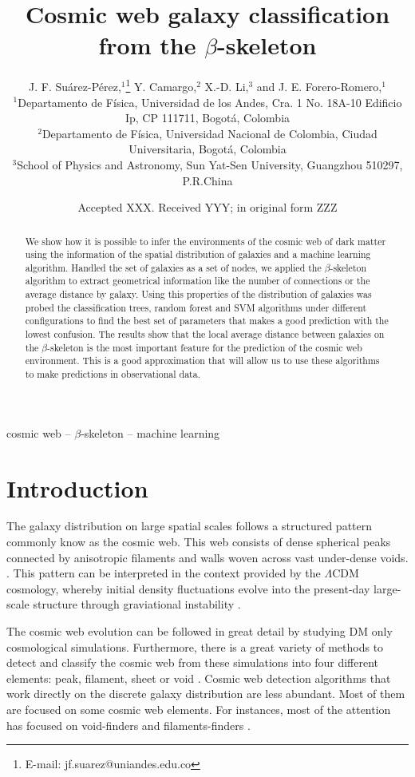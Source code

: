\documentclass[usenatbib]{mnras}
\title[The $\beta$-skeleton and the T-web]{Cosmic web galaxy classification from the $\beta$-skeleton}
\author[J. F. Su\'arez-P\'erez et al.]{
J. F. Su\'arez-P\'erez,$^{1}$\thanks{E-mail: jf.suarez@uniandes.edu.co}
Y. Camargo,$^{2}$ 
X.-D. Li,$^{3}$
and J. E. Forero-Romero,$^{1}$
\\
$^{1}$Departamento de F\'isica, Universidad de los Andes, Cra. 1 No. 18A-10 Edificio Ip, CP 111711, Bogot\'a, Colombia\\
$^{2}$Departamento de F\'isica, Universidad Nacional de Colombia, Ciudad Universitaria, Bogot\'a, Colombia\\
$^{3}$School of Physics and Astronomy, Sun Yat-Sen University, Guangzhou 510297, P.R.China\\
}
\date{Accepted XXX. Received YYY; in original form ZZZ}
\begin{document}
\label{firstpage}
\pagerange{\pageref{firstpage}--\pageref{lastpage}}
\maketitle

\begin{abstract}
We show how it is possible to infer the environments of the cosmic web
of dark matter using the information of the spatial distribution of
galaxies and a machine learning algorithm.
Handled the set of galaxies
as a set of nodes, we applied the $\beta$-skeleton algorithm to
extract geometrical information like the number of connections or the
average distance by galaxy.
Using this properties of the distribution
of galaxies was probed the classification trees, random forest and SVM algorithms under
different configurations to find the best set of parameters that makes
a good prediction with the lowest confusion. 
The results show that the
local average distance between galaxies on the $\beta$-skeleton is the
most important feature for the prediction of the cosmic web
environment. 
This is a good approximation that will allow us to use
these algorithms to make predictions in observational data. 
\end{abstract}

\begin{keywords}
cosmic web -- $\beta$-skeleton -- machine learning
\end{keywords}


\section{Introduction}
The galaxy distribution on large spatial scales follows a structured 
pattern commonly know as the cosmic web. 
This web consists of dense spherical peaks connected by
anisotropic filaments and walls woven across vast under-dense voids.
\citep{Bond1996}. 
This pattern can be interpreted in the context provided
by the $\Lambda$CDM cosmology, whereby initial density fluctuations 
evolve into the present-day large-scale structure through graviational instability \citep{ZelDovich1970,White1987}. 

The cosmic web evolution can be followed in great detail by studying DM only
cosmological simulations. Furthermore, there is a great variety of methods to detect and classify the cosmic web from these simulations into four different elements: peak, filament, sheet or void \citep{Libeskind2018}.
Cosmic web detection algorithms that work directly on the discrete galaxy distribution are less abundant.
Most of them are focused on some cosmic web elements.
For instances, most of the attention has focused on void-finders \citep{Platen2007,Neyrinck2008,Ravoux2020} and filaments-finders \citep{Novikov2003,Zhang2009,Sousbie2010,Chen2015,Luber2019,Malavasi2020}. 
\end{document}
